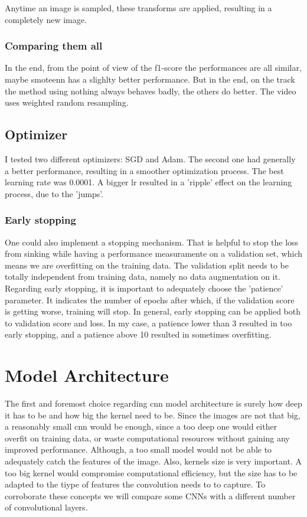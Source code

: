 \documentclass[12pt,a4paper,oneside]{article}
\begin{document}
Anytime an image is sampled, these transforms are applied, resulting in a
completely new image.

\subsubsection{Comparing them all}

In the end, from the point of view of the f1-score the performances are all
similar, maybe smoteenn has a slighlty better performance. But in the end, on
the track the method using nothing always behaves badly, the others do better.
The video uses weighted random resampling.

\subsection{Optimizer}

I tested two different optimizers: SGD and Adam. The second one had generally a
better performance, resulting in a smoother optimization process. The best
learning rate was 0.0001. A bigger lr resulted in a 'ripple' effect on the
learning process, due to the 'jumps'.

\subsubsection{Early stopping}
One could also implement a stopping mechanism. That is helpful to stop the loss
from sinking while having a performance measuramente on a validation set, which
means we are overfitting on the training data. The validation split needs to be
totally independent from training data, namely no data augmentation on it.
Regarding early stopping, it is important to adequately choose the 'patience'
parameter. It indicates the number of epochs after which, if the validation
score is getting worse, training will stop. In general, early stopping can be
applied both to validation score and loss. In my case, a patience lower than 3
resulted in too early stopping, and a patience above 10 resulted in sometimes
overfitting. 

\section{Model Architecture}

The first and foremost choice regarding cnn model architecture is surely how
deep it has to be and how big the kernel need to be. Since the images are not
that big, a reasonably small cnn would be enough, since a too deep one would
either overfit on training data, or waste computational resources without
gaining any improved performance. Although, a too small model would not be able
to adequately catch the features of the image. Also, kernels size is very
important. A too big kernel would compromise computational efficiency, but the
size has to be adapted to the tiype of features the convolution needs to to
capture. To corroborate these concepts we will compare some CNNs with a
different number of convolutional layers. 
\end{document}

